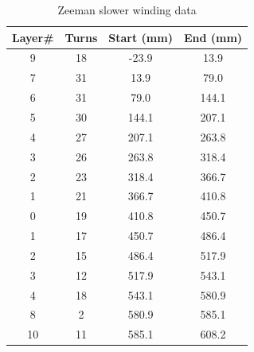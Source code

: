 \documentclass[12pt,a4paper]{article}
\begin{document}
\begin{table}[htb]
\begin{center}
\begin{tabular}{|c|c|c|c|}
\hline 
\textbf{Layer\#} & \textbf{Turns} & \textbf{Start (mm)} & \textbf{End (mm)} \\ 
\hline 
9 & 18 & -23.9 & 13.9 \\ 
\hline 
7 & 31 & 13.9 & 79.0 \\ 
\hline 
6 & 31 & 79.0 & 144.1 \\ 
\hline 
5 & 30 & 144.1 & 207.1 \\ 
\hline 
4 & 27 & 207.1 & 263.8 \\ 
\hline 
3 & 26 & 263.8 & 318.4 \\ 
\hline 
2 & 23 & 318.4 & 366.7 \\ 
\hline 
1 & 21 & 366.7 & 410.8 \\ 
\hline 
0 & 19 & 410.8 & 450.7 \\ 
\hline 
1 & 17 & 450.7 & 486.4 \\ 
\hline 
2 & 15 & 486.4 & 517.9 \\ 
\hline 
3 & 12 & 517.9 & 543.1 \\ 
\hline 
4 & 18 & 543.1 & 580.9 \\ 
\hline 
8 & 2 & 580.9 & 585.1 \\ 
\hline 
10 & 11 & 585.1 & 608.2 \\ 
\hline 
\end{tabular} 
\end{center}
\caption{Zeeman slower winding data}
\label{tab:layers}
\end{table}
\end{document}
